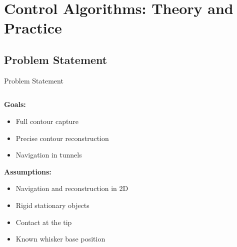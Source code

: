 \documentclass[AIRbeamer
,optEnglish
,optBiber
,optBibstyleAlphabetic
,optBeamerClassicFormat%
]{AIRlatex}
\begin{document}
    \section{Control Algorithms: Theory and Practice}

    \subsection{Problem Statement}
    \begin{frame}{Problem Statement}
        \begin{columns}[T,onlytextwidth]
            \begin{column}[T]{0.4\textwidth}
                \textbf{Goals:}
                \begin{itemize}
                    \item Full contour capture
                    \item Precise contour reconstruction
                    \item Navigation in tunnels
                \end{itemize}
                \textbf{Assumptions:}
                \begin{itemize}
                    \item Navigation and reconstruction in 2D
                    \item Rigid stationary objects
                    \item Contact at the tip
                    \item Known whisker base position
                \end{itemize}
            \end{column}
        \end{columns}
    \end{frame}
\end{document}
